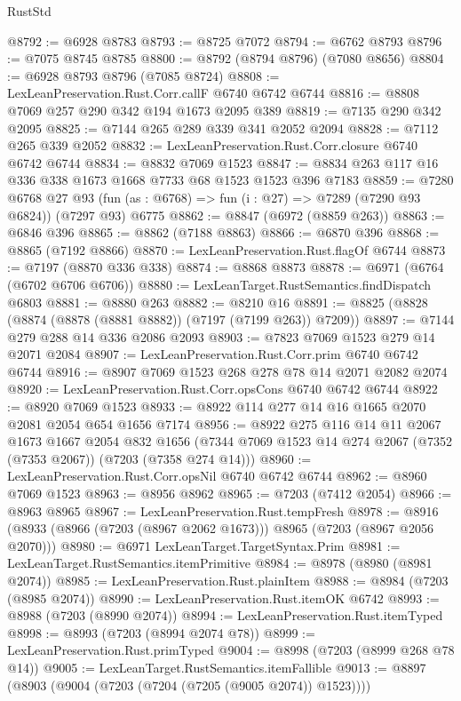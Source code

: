 \begin{lexlean}{RustStd}
\begin{coremodule}
@8792 := @6928 @8783
@8793 := @8725 @7072
@8794 := @6762 @8793
@8796 := @7075 @8745 @8785
@8800 := @8792 (@8794 @8796) (@7080 @8656)
@8804 := @6928 @8793 @8796 (@7085 @8724)
@8808 := LexLeanPreservation.Rust.Corr.callF @6740 @6742 @6744
@8816 := @8808 @7069 @257 @290 @342 @194 @1673 @2095 @389
@8819 := @7135 @290 @342 @2095
@8825 := @7144 @265 @289 @339 @341 @2052 @2094
@8828 := @7112 @265 @339 @2052
@8832 := LexLeanPreservation.Rust.Corr.closure @6740 @6742 @6744
@8834 := @8832 @7069 @1523
@8847 := @8834 @263 @117 @16 @336 @338 @1673 @1668 @7733 @68 @1523 @1523 @396 @7183
@8859 := @7280
    @6768
    @27
    @93
    (fun (as : @6768) => fun (i : @27) => @7289 (@7290 @93 @6824))
    (@7297 @93)
    @6775
@8862 := @8847 (@6972 (@8859 @263))
@8863 := @6846 @396
@8865 := @8862 (@7188 @8863)
@8866 := @6870 @396
@8868 := @8865 (@7192 @8866)
@8870 := LexLeanPreservation.Rust.flagOf @6744
@8873 := @7197 (@8870 @336 @338)
@8874 := @8868 @8873
@8878 := @6971 (@6764 (@6702 @6706 @6706))
@8880 := LexLeanTarget.RustSemantics.findDispatch @6803
@8881 := @8880 @263
@8882 := @8210 @16
@8891 := @8825 (@8828 (@8874 (@8878 (@8881 @8882)) (@7197 (@7199 @263)) @7209))
@8897 := @7144 @279 @288 @14 @336 @2086 @2093
@8903 := @7823 @7069 @1523 @279 @14 @2071 @2084
@8907 := LexLeanPreservation.Rust.Corr.prim @6740 @6742 @6744
@8916 := @8907 @7069 @1523 @268 @278 @78 @14 @2071 @2082 @2074
@8920 := LexLeanPreservation.Rust.Corr.opsCons @6740 @6742 @6744
@8922 := @8920 @7069 @1523
@8933 := @8922 @114 @277 @14 @16 @1665 @2070 @2081 @2054 @654 @1656 @7174
@8956 := @8922
    @275
    @116
    @14
    @11
    @2067
    @1673
    @1667
    @2054
    @832
    @1656
    (@7344 @7069 @1523 @14 @274 @2067 (@7352 (@7353 @2067)) (@7203 (@7358 @274 @14)))
@8960 := LexLeanPreservation.Rust.Corr.opsNil @6740 @6742 @6744
@8962 := @8960 @7069 @1523
@8963 := @8956 @8962
@8965 := @7203 (@7412 @2054)
@8966 := @8963 @8965
@8967 := LexLeanPreservation.Rust.tempFresh
@8978 := @8916 (@8933 (@8966 (@7203 (@8967 @2062 @1673))) @8965 (@7203 (@8967 @2056 @2070)))
@8980 := @6971 LexLeanTarget.TargetSyntax.Prim
@8981 := LexLeanTarget.RustSemantics.itemPrimitive
@8984 := @8978 (@8980 (@8981 @2074))
@8985 := LexLeanPreservation.Rust.plainItem
@8988 := @8984 (@7203 (@8985 @2074))
@8990 := LexLeanPreservation.Rust.itemOK @6742
@8993 := @8988 (@7203 (@8990 @2074))
@8994 := LexLeanPreservation.Rust.itemTyped
@8998 := @8993 (@7203 (@8994 @2074 @78))
@8999 := LexLeanPreservation.Rust.primTyped
@9004 := @8998 (@7203 (@8999 @268 @78 @14))
@9005 := LexLeanTarget.RustSemantics.itemFallible
@9013 := @8897 (@8903 (@9004 (@7203 (@7204 (@7205 (@9005 @2074)) @1523))))

\end{coremodule}
\end{lexlean}

